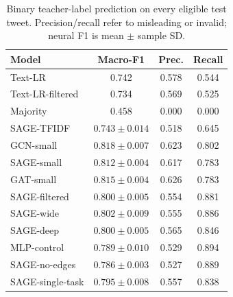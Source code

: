 \begin{table}[t]
\centering
\footnotesize
\caption{Binary teacher-label prediction on every eligible test tweet. Precision/recall refer to misleading or invalid; neural F1 is mean $\pm$ sample SD.}
\label{tab:labels-v2}
\setlength{\tabcolsep}{4pt}
\begin{tabular}{lccc}
\toprule
Model & Macro-F1 & Prec. & Recall \\
\midrule
Text-LR & 0.742 & 0.578 & 0.544 \\
Text-LR-filtered & 0.734 & 0.569 & 0.525 \\
Majority & 0.458 & 0.000 & 0.000 \\
SAGE-TFIDF & $0.743\pm0.014$ & 0.518 & 0.645 \\
GCN-small & $0.818\pm0.007$ & 0.623 & 0.802 \\
SAGE-small & $0.812\pm0.004$ & 0.617 & 0.783 \\
GAT-small & $0.815\pm0.004$ & 0.626 & 0.783 \\
SAGE-filtered & $0.800\pm0.005$ & 0.554 & 0.881 \\
SAGE-wide & $0.802\pm0.009$ & 0.555 & 0.886 \\
SAGE-deep & $0.800\pm0.005$ & 0.565 & 0.846 \\
MLP-control & $0.789\pm0.010$ & 0.529 & 0.894 \\
SAGE-no-edges & $0.786\pm0.003$ & 0.527 & 0.889 \\
SAGE-single-task & $0.795\pm0.008$ & 0.557 & 0.838 \\
\bottomrule
\end{tabular}
\end{table}
